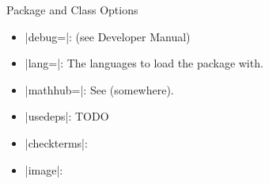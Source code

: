 \documentclass{stex}
\begin{document}
\begin{sfragment}{Package and Class Options}
  
    \begin{itemize}
      \item|debug=|: (see Developer Manual)
      \item|lang=|: The languages to load the 
        package with.
      \item|mathhub=|: See (somewhere).
      \item|usedeps|: TODO
      \item|checkterms|:
      \item|image|:
    \end{itemize}

\end{sfragment}
\end{document}
